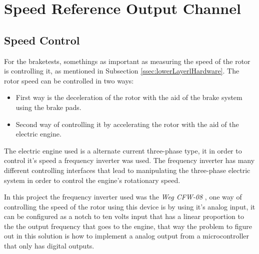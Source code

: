 \section{Speed Reference Output Channel}\label{sec:speed-reference-output-channel}

	\subsection{Speed Control}\label{ssec:speed-control}
		\par
		For the braketests, somethings as important as measuring the speed of the rotor is controlling it, as mentioned in Subsection \ref{ssec:lowerLayerlHardware}. The rotor speed can be controlled in two ways:
			\begin{itemize}
				\item First way is the deceleration of the rotor with the aid of the brake system using the brake pads.
				\item Second way of controlling it by accelerating the rotor with the aid of the electric engine.
			\end{itemize}
		The electric engine used is a alternate current three-phase type, it in order to control it's speed a frequency inverter was used. The frequency inverter has many different controlling interfaces that lead to manipulating the three-phase electric system in order to control the engine's rotationary speed.
		\par
		In this project the frequency inverter used was the \textit{Weg CFW-08} \cite{wegCFW08Manual}, one way of controlling the speed of the rotor using this device is by using it's analog input, it can be configured as a notch to ten volts input that has a linear proportion to the the output frequency that goes to the engine, that way the problem to figure out in this solution is how to implement a analog output from a microcontroller that only has digital outputs.

